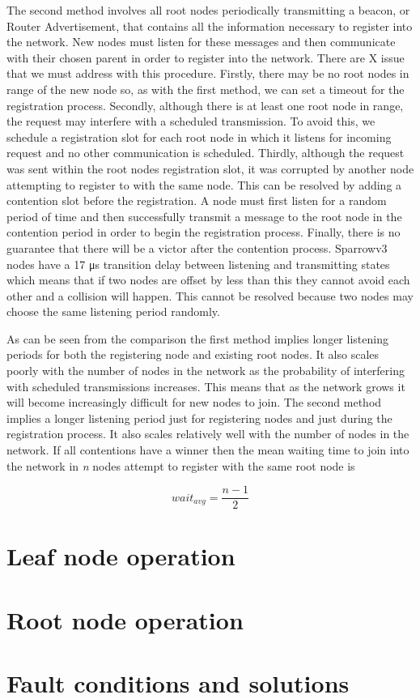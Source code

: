 The second method involves all root nodes periodically transmitting a beacon,
or Router Advertisement, that contains all the information necessary to
register into the network. New nodes must listen for these messages and then
communicate with their chosen parent in order to register into the network.
There are X issue that we must address with this procedure. Firstly, there may
be no root nodes in range of the new node so, as with the first method, we can
set a timeout for the registration process. Secondly, although there is at
least one root node in range, the request may interfere with a scheduled
transmission. To avoid this, we schedule a registration slot for each root node
in which it listens for incoming request and no other communication is
scheduled. Thirdly, although the request was sent within the root nodes
registration slot, it was corrupted by another node attempting to register to
with the same node. This can be resolved by adding a contention slot before the
registration. A node must first listen for a random period of time and then
successfully transmit a message to the root node in the contention period in
order to begin the registration process. Finally, there is no guarantee that
there will be a victor after the contention process. Sparrowv3 nodes have a 17
μs transition delay between listening and transmitting states which means that
if two nodes are offset by less than this they cannot avoid each other and a
collision will happen. This cannot be resolved because two nodes may choose the
same listening period randomly.

As can be seen from the comparison the first method implies longer listening
periods for both the registering node and existing root nodes. It also scales poorly
with the number of nodes in the network as the probability of interfering with
scheduled transmissions increases. This means that as the network grows it will
become increasingly difficult for new nodes to join. The second method implies
a longer listening period just for registering nodes and just during the
registration process. It also scales relatively well with the number of nodes
in the network. If all contentions have a winner then the mean waiting time to
join into the network in \emph{n} nodes attempt to register with the same root
node is 

\[wait_{avg} = \frac{n-1}{2}\]

\section{Leaf node operation}

\section{Root node operation}

\section{Fault conditions and solutions}

